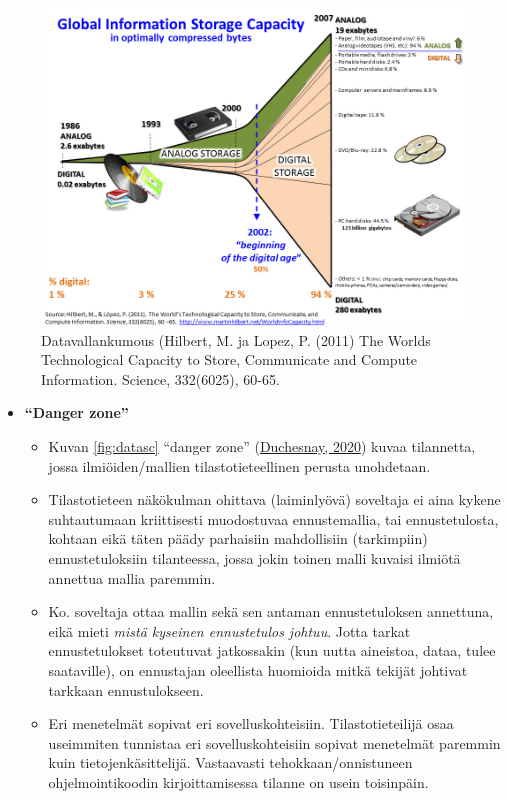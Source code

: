 \documentclass[
]{book}
\providecommand{\tightlist}{%
  \setlength{\itemsep}{0pt}\setlength{\parskip}{0pt}}
\begin{document}
\begin{figure}

{\centering \includegraphics[width=1\linewidth]{images/datarevolution} 

}

\caption{Datavallankumous (Hilbert, M. ja Lopez, P. (2011) The Worlds Technological Capacity to Store, Communicate and Compute Information. Science, 332(6025), 60-65.}\label{fig:datarevolution}
\end{figure}

\begin{itemize}
\tightlist
\item
  \textbf{``Danger zone''}

  \begin{itemize}
  \tightlist
  \item
    Kuvan \ref{fig:datasc} ``danger zone'' (\href{https://duchesnay.github.io/pystatsml/introduction/machine_learning.html}{Duchesnay, 2020}) kuvaa tilannetta, jossa ilmiöiden/mallien tilastotieteellinen perusta unohdetaan.
  \item
    Tilastotieteen näkökulman ohittava (laiminlyövä) soveltaja ei aina kykene suhtautumaan kriittisesti muodostuvaa ennustemallia, tai ennustetulosta, kohtaan eikä täten päädy parhaisiin mahdollisiin (tarkimpiin) ennustetuloksiin tilanteessa, jossa jokin toinen malli kuvaisi ilmiötä annettua mallia paremmin.
  \item
    Ko. soveltaja ottaa mallin sekä sen antaman ennustetuloksen annettuna, eikä mieti \emph{mistä kyseinen ennustetulos johtuu}. Jotta tarkat ennustetulokset toteutuvat jatkossakin (kun uutta aineistoa, dataa, tulee saataville), on ennustajan oleellista huomioida mitkä tekijät johtivat tarkkaan ennustulokseen.
  \item
    Eri menetelmät sopivat eri sovelluskohteisiin. Tilastotieteilijä osaa useimmiten tunnistaa eri sovelluskohteisiin sopivat menetelmät paremmin kuin tietojenkäsittelijä. Vastaavasti tehokkaan/onnistuneen ohjelmointikoodin kirjoittamisessa tilanne on usein toisinpäin.
  \end{itemize}
\end{itemize}
\end{document}
